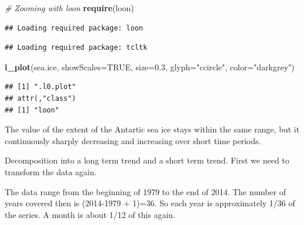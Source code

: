 \documentclass[9pt,letter]{article}
\newenvironment{Shaded}{\begin{snugshade}}{\end{snugshade}}
\newcommand{\KeywordTok}[1]{\textcolor[rgb]{0.13,0.29,0.53}{\textbf{#1}}}
\newcommand{\DataTypeTok}[1]{\textcolor[rgb]{0.13,0.29,0.53}{#1}}
\newcommand{\FloatTok}[1]{\textcolor[rgb]{0.00,0.00,0.81}{#1}}
\newcommand{\StringTok}[1]{\textcolor[rgb]{0.31,0.60,0.02}{#1}}
\newcommand{\CommentTok}[1]{\textcolor[rgb]{0.56,0.35,0.01}{\textit{#1}}}
\newcommand{\OtherTok}[1]{\textcolor[rgb]{0.56,0.35,0.01}{#1}}
\newcommand{\OperatorTok}[1]{\textcolor[rgb]{0.81,0.36,0.00}{\textbf{#1}}}
\newcommand{\NormalTok}[1]{#1}
\begin{document}
\begin{Shaded}
\begin{Highlighting}[]
\CommentTok{# Zooming with loon}
\KeywordTok{require}\NormalTok{(loon)}
\end{Highlighting}
\end{Shaded}

\begin{verbatim}
## Loading required package: loon
\end{verbatim}

\begin{verbatim}
## Loading required package: tcltk
\end{verbatim}

\begin{Shaded}
\begin{Highlighting}[]
\KeywordTok{l_plot}\NormalTok{(sea.ice, }\DataTypeTok{showScales=}\OtherTok{TRUE}\NormalTok{, }
     \DataTypeTok{size=}\FloatTok{0.3}\NormalTok{, }\DataTypeTok{glyph=}\StringTok{"ccircle"}\NormalTok{, }
     \DataTypeTok{color=}\StringTok{"darkgrey"}\NormalTok{)}
\end{Highlighting}
\end{Shaded}

\begin{verbatim}
## [1] ".l0.plot"
## attr(,"class")
## [1] "loon"
\end{verbatim}

The value of the extent of the Antartic sea ice stays within the same
range, but it continuously sharply decreasing and increasing over short
time periods.

\item 

Decomposition into a long term trend and a short term trend. First we
need to transform the data again.

\begin{Shaded}
\end{Shaded}

The data range from the beginning of 1979 to the end of 2014. The number
of years covered then is (2014-1979 + 1)=36. So each year is
approximately 1/36 of the series. A month is about 1/12 of this again.
\end{document}
